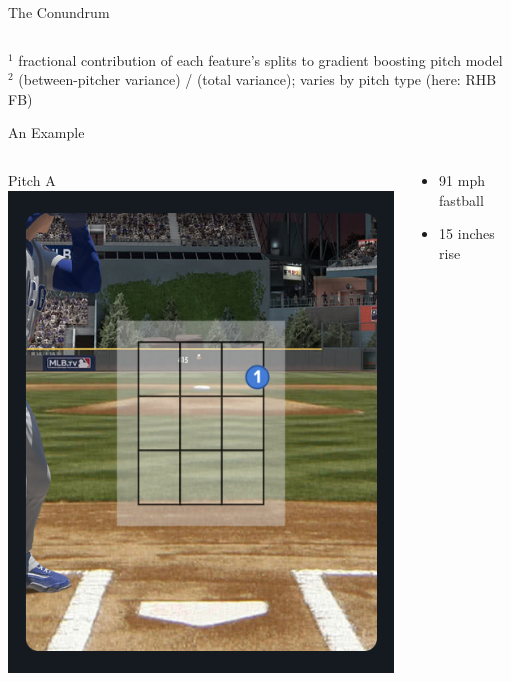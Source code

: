 \documentclass{beamer}
\begin{document}
\begin{frame}{The Conundrum}
\begin{columns}
\begin{column}{0.5\textwidth}
      \end{column}
    \end{columns}
    \scriptsize \color{ricegray}
    \vfill
    ${}^1$ fractional contribution of each feature's splits to gradient boosting pitch model\\
    ${}^2$ (between-pitcher variance) / (total variance); varies by pitch type (here: RHB FB)
  \end{frame}

  \begin{frame}{An Example}
    \begin{columns}
      \begin{column}{0.2\textwidth}
        \centering
        Pitch A\\
        \includegraphics[width = \textwidth]{images/pitch_on_edge}
      \end{column}
      \begin{column}{0.8\textwidth}
        \begin{itemize}
          \item 91 mph fastball
          \item 15 inches rise

\end{itemize}
\end{column}
\end{columns}
\end{frame}
\end{document}
